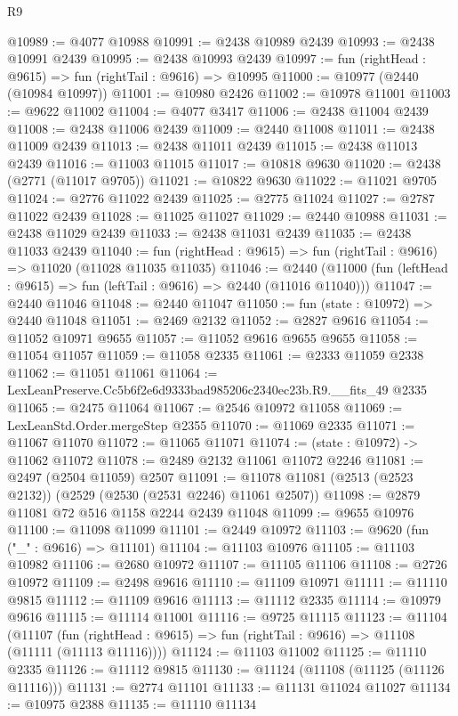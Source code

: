 \begin{lexlean}{R9}
\begin{coremodule}
@10989 := @4077 @10988
@10991 := @2438 @10989 @2439
@10993 := @2438 @10991 @2439
@10995 := @2438 @10993 @2439
@10997 := fun (rightHead : @9615) => fun (rightTail : @9616) => @10995
@11000 := @10977 (@2440 (@10984 @10997))
@11001 := @10980 @2426
@11002 := @10978 @11001
@11003 := @9622 @11002
@11004 := @4077 @3417
@11006 := @2438 @11004 @2439
@11008 := @2438 @11006 @2439
@11009 := @2440 @11008
@11011 := @2438 @11009 @2439
@11013 := @2438 @11011 @2439
@11015 := @2438 @11013 @2439
@11016 := @11003 @11015
@11017 := @10818 @9630
@11020 := @2438 (@2771 (@11017 @9705))
@11021 := @10822 @9630
@11022 := @11021 @9705
@11024 := @2776 @11022 @2439
@11025 := @2775 @11024
@11027 := @2787 @11022 @2439
@11028 := @11025 @11027
@11029 := @2440 @10988
@11031 := @2438 @11029 @2439
@11033 := @2438 @11031 @2439
@11035 := @2438 @11033 @2439
@11040 := fun (rightHead : @9615) => fun (rightTail : @9616) => @11020 (@11028 @11035 @11035)
@11046 := @2440 (@11000 (fun (leftHead : @9615) => fun (leftTail : @9616) => @2440 (@11016 @11040)))
@11047 := @2440 @11046
@11048 := @2440 @11047
@11050 := fun (state : @10972) => @2440 @11048
@11051 := @2469 @2132
@11052 := @2827 @9616
@11054 := @11052 @10971 @9655
@11057 := @11052 @9616 @9655 @9655
@11058 := @11054 @11057
@11059 := @11058 @2335
@11061 := @2333 @11059 @2338
@11062 := @11051 @11061
@11064 := LexLeanPreserve.Cc5b6f2e6d9333bad985206c2340ec23b.R9.__fits_49 @2335
@11065 := @2475 @11064
@11067 := @2546 @10972 @11058
@11069 := LexLeanStd.Order.mergeStep @2355
@11070 := @11069 @2335
@11071 := @11067 @11070
@11072 := @11065 @11071
@11074 := (state : @10972) -> @11062 @11072
@11078 := @2489 @2132 @11061 @11072 @2246
@11081 := @2497 (@2504 @11059) @2507
@11091 := @11078 @11081 (@2513 (@2523 @2132)) (@2529 (@2530 (@2531 @2246) @11061 @2507))
@11098 := @2879 @11081 @72 @516 @1158 @2244 @2439 @11048
@11099 := @9655 @10976
@11100 := @11098 @11099
@11101 := @2449 @10972
@11103 := @9620 (fun ("_" : @9616) => @11101)
@11104 := @11103 @10976
@11105 := @11103 @10982
@11106 := @2680 @10972
@11107 := @11105 @11106
@11108 := @2726 @10972
@11109 := @2498 @9616
@11110 := @11109 @10971
@11111 := @11110 @9815
@11112 := @11109 @9616
@11113 := @11112 @2335
@11114 := @10979 @9616
@11115 := @11114 @11001
@11116 := @9725 @11115
@11123 := @11104
    (@11107 (fun (rightHead : @9615) => fun (rightTail : @9616) => @11108 (@11111 (@11113 @11116))))
@11124 := @11103 @11002
@11125 := @11110 @2335
@11126 := @11112 @9815
@11130 := @11124 (@11108 (@11125 (@11126 @11116)))
@11131 := @2774 @11101
@11133 := @11131 @11024 @11027
@11134 := @10975 @2388
@11135 := @11110 @11134

\end{coremodule}
\end{lexlean}
